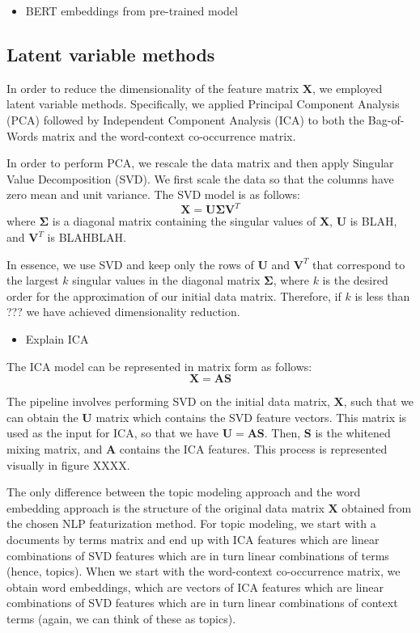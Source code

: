 \documentclass{article}
\begin{document}
\begin{itemize}
\tightlist
\item
  BERT embeddings from pre-trained model
\end{itemize}

\hypertarget{latent-variable-methods}{%
\subsection{Latent variable methods}\label{latent-variable-methods}}

In order to reduce the dimensionality of the feature matrix
\(\mathbf{X}\), we employed latent variable methods. Specifically, we
applied Principal Component Analysis (PCA) followed by Independent
Component Analysis (ICA) to both the Bag-of-Words matrix and the
word-context co-occurrence matrix.

In order to perform PCA, we rescale the data matrix and then apply
Singular Value Decomposition (SVD). We first scale the data so that the
columns have zero mean and unit variance. The SVD model is as follows:
\[\mathbf{X = U \Sigma V}^T\] where \(\mathbf{\Sigma}\) is a diagonal
matrix containing the singular values of \(\mathbf{X}\), \(\mathbf{U}\)
is BLAH, and \(\mathbf{V}^T\) is BLAHBLAH.

In essence, we use SVD and keep only the rows of \(\mathbf{U}\) and
\(\mathbf{V}^T\) that correspond to the largest \(k\) singular values in
the diagonal matrix \(\mathbf{\Sigma}\), where \(k\) is the desired
order for the approximation of our initial data matrix. Therefore, if
\(k\) is less than ??? we have achieved dimensionality reduction.

\begin{itemize}
\tightlist
\item
  Explain ICA
\end{itemize}

The ICA model can be represented in matrix form as follows:
\[\mathbf{X = AS}\]

The pipeline involves performing SVD on the initial data matrix,
\(\mathbf{X}\), such that we can obtain the \(\mathbf{U}\) matrix which
contains the SVD feature vectors. This matrix is used as the input for
ICA, so that we have \(\mathbf{U = AS}\). Then, \(\mathbf{S}\) is the
whitened mixing matrix, and \(\mathbf{A}\) contains the ICA features.
This process is represented visually in figure XXXX.

The only difference between the topic modeling approach and the word
embedding approach is the structure of the original data matrix
\(\mathbf{X}\) obtained from the chosen NLP featurization method. For
topic modeling, we start with a documents by terms matrix and end up
with ICA features which are linear combinations of SVD features which
are in turn linear combinations of terms (hence, topics). When we start
with the word-context co-occurrence matrix, we obtain word embeddings,
which are vectors of ICA features which are linear combinations of SVD
features which are in turn linear combinations of context terms (again,
we can think of these as topics).
\end{document}
